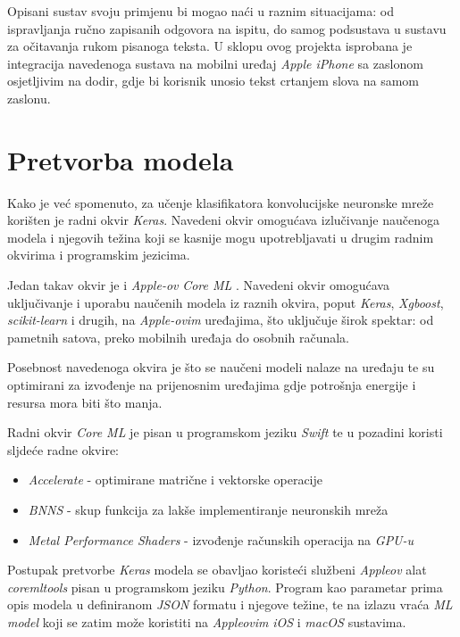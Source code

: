 Opisani sustav svoju primjenu bi mogao naći u raznim situacijama: od ispravljanja ručno zapisanih odgovora na ispitu, do samog podsustava u sustavu za očitavanja rukom pisanoga teksta. U sklopu ovog projekta isprobana je integracija navedenoga sustava na mobilni uređaj \emph{Apple iPhone} sa zaslonom osjetljivim na dodir, gdje bi korisnik unosio tekst crtanjem slova na samom zaslonu.

\section{Pretvorba modela}

Kako je već spomenuto, za učenje klasifikatora konvolucijske neuronske mreže korišten je radni okvir \emph{Keras}. Navedeni okvir omogućava izlučivanje naučenoga modela i njegovih težina koji se kasnije mogu upotrebljavati u drugim radnim okvirima i programskim jezicima.

Jedan takav okvir je i \emph{Apple-ov} \emph{Core ML} \cite{coreml}. Navedeni okvir omogućava uključivanje i uporabu naučenih modela iz raznih okvira, poput \emph{Keras}, \emph{Xgboost}, \emph{scikit-learn} i drugih, na \emph{Apple-ovim} uređajima, što uključuje širok spektar: od pametnih satova, preko mobilnih uređaja do osobnih računala.

Posebnost navedenoga okvira je što se naučeni modeli nalaze na uređaju te su optimirani za izvođenje na prijenosnim uređajima gdje potrošnja energije i resursa mora biti što manja.

Radni okvir \emph{Core ML} je pisan u programskom jeziku \emph{Swift} te u pozadini koristi sljdeće radne okvire:
\begin{itemize}
  \item \emph{Accelerate} - optimirane matrične i vektorske operacije
  \item \emph{BNNS} - skup funkcija za lakše implementiranje neuronskih mreža
  \item \emph{Metal Performance Shaders} - izvođenje računskih operacija na \emph{GPU-u}
\end{itemize}

Postupak pretvorbe \emph{Keras} modela se obavljao koristeći službeni \emph{Appleov} alat \emph{coremltools} pisan u programskom jeziku \emph{Python}. Program kao parametar prima opis modela u definiranom \emph{JSON} formatu i njegove težine, te na izlazu vraća \emph{ML model} koji se zatim može koristiti na \emph{Appleovim} \emph{iOS} i \emph{macOS} sustavima.

